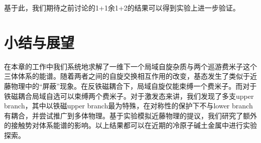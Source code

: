 基于此，我们期待之前讨论的1+1余1+2的结果可以得到实验上进一步验证。

\section{小结与展望}\label{2sec:spex-summary}
在本章的工作中我们系统地求解了一维下一个局域自旋杂质与两个巡游费米子这个三体体系的能谱。随着两者之间的自旋交换相互作用的改变，基态发生了类似于近藤物理中的“屏蔽”现象。在反铁磁耦合下，局域自旋仅能束缚一个费米子。而对于铁磁耦合局域自选可以束缚两个费米子。对于激发态来讲，我们发现了多支upper branch，其中以铁磁upper branch最为特殊，在对称性的保护下不与lower branch有耦合，并尝试推广到多体物理。基于实验模拟近藤物理的提议，我们研究了额外的接触势对体系能谱的影响。以上结果都可以在近期的冷原子碱土金属中进行实验探索。
